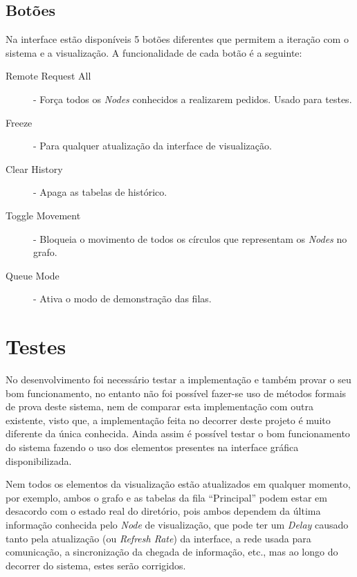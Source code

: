 \subsection*{Botões}
Na interface estão disponíveis 5 botões diferentes que permitem a iteração com o sistema e a visualização. A funcionalidade de cada botão é a seguinte:
\begin{description}
    \item [Remote Request All] - Força todos os \emph{Nodes} conhecidos a realizarem pedidos. Usado para testes.
    \item [Freeze] - Para qualquer atualização da interface de visualização.
    \item [Clear History] - Apaga as tabelas de histórico.
    \item [Toggle Movement] - Bloqueia o movimento de todos os círculos que representam os \emph{Nodes} no grafo.
    \item [Queue Mode] - Ativa o modo de demonstração das filas.

\end{description}

\section{Testes}
\label{validacao:sec:testes}
No desenvolvimento foi necessário testar a implementação e também provar o seu bom funcionamento, no entanto não foi possível fazer-se uso de métodos formais de prova deste sistema, nem de comparar esta implementação com outra existente, visto que, a implementação feita no decorrer deste projeto é muito diferente da única conhecida.
Ainda assim é possível testar o bom funcionamento do sistema fazendo o uso dos elementos presentes na interface gráfica disponibilizada.

Nem todos os elementos da visualização estão atualizados em qualquer momento, por exemplo, ambos o grafo e as tabelas da fila ``Principal'' podem estar em desacordo com o estado real do diretório, pois ambos dependem da última informação conhecida pelo \emph{Node} de visualização, que pode ter um \emph{Delay} causado tanto pela atualização (ou \emph{Refresh Rate}) da interface, a rede usada para comunicação, a sincronização da chegada de informação, etc., mas ao longo do decorrer do sistema, estes serão corrigidos.


